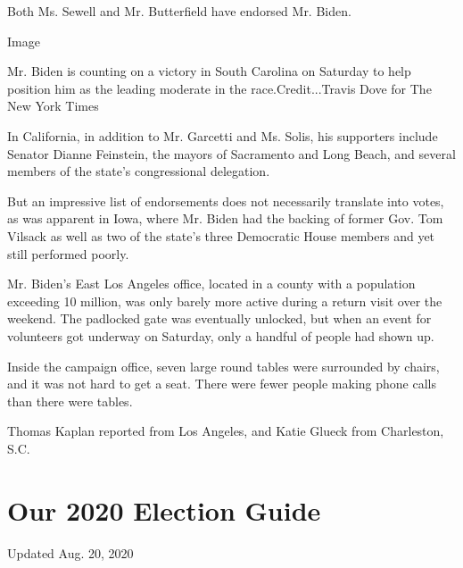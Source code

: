 Both Ms. Sewell and Mr. Butterfield have endorsed Mr. Biden.

Image

Mr. Biden is counting on a victory in South Carolina on Saturday to help
position him as the leading moderate in the race.Credit...Travis Dove
for The New York Times

In California, in addition to Mr. Garcetti and Ms. Solis, his supporters
include Senator Dianne Feinstein, the mayors of Sacramento and Long
Beach, and several members of the state's congressional delegation.

But an impressive list of endorsements does not necessarily translate
into votes, as was apparent in Iowa, where Mr. Biden had the backing of
former Gov. Tom Vilsack as well as two of the state's three Democratic
House members and yet still performed poorly.

Mr. Biden's East Los Angeles office, located in a county with a
population exceeding 10 million, was only barely more active during a
return visit over the weekend. The padlocked gate was eventually
unlocked, but when an event for volunteers got underway on Saturday,
only a handful of people had shown up.

Inside the campaign office, seven large round tables were surrounded by
chairs, and it was not hard to get a seat. There were fewer people
making phone calls than there were tables.

Thomas Kaplan reported from Los Angeles, and Katie Glueck from
Charleston, S.C.

\hypertarget{our-2020-election-guide}{%
\section{Our 2020 Election Guide}\label{our-2020-election-guide}}

Updated Aug. 20, 2020

